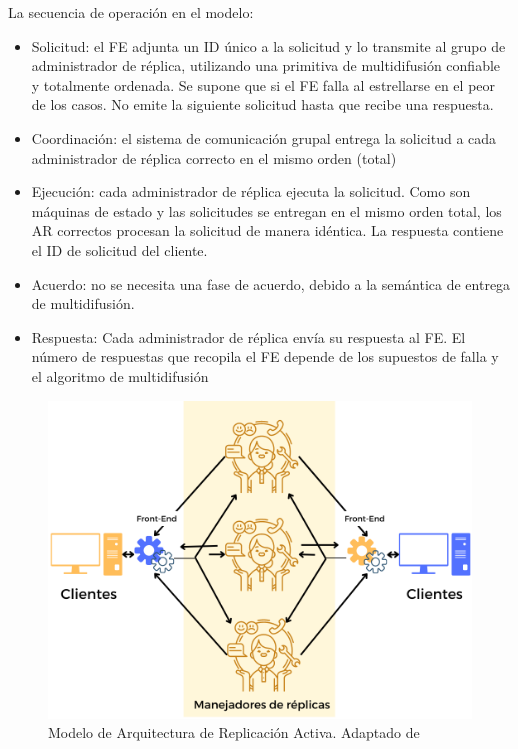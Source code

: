 	 La secuencia de  operación en el modelo:
	 \begin{itemize}
	 	\item  Solicitud: el FE adjunta un ID único a la solicitud y lo transmite al grupo de administrador de réplica, utilizando una primitiva de multidifusión confiable y totalmente ordenada. 
	 	Se supone que si el FE falla al estrellarse en el peor de los casos. No emite la siguiente solicitud hasta que recibe una respuesta. 
	 	\item Coordinación: el sistema de comunicación grupal entrega la solicitud a cada administrador de réplica correcto en el mismo orden (total) 
	 	
	 	\item Ejecución: cada administrador de réplica ejecuta la solicitud. Como son máquinas de estado y las solicitudes se entregan en el mismo orden total, los AR correctos procesan la solicitud de manera idéntica. La respuesta contiene el  ID de solicitud del cliente. 
	 	\item Acuerdo: no se necesita una fase de acuerdo, debido a la semántica de entrega de multidifusión. 
	 	\item Respuesta: Cada administrador de réplica envía su respuesta al FE. El número de respuestas que recopila el FE depende de los supuestos de falla y el algoritmo de multidifusión 
	 \end{itemize}
	 
 \begin{figure}    
 	\begin{center}%
 	\includegraphics [width=0.8\linewidth]{9/2.png } 
 	\caption{Modelo de Arquitectura de Replicación Activa. Adaptado de \cite{Coulouris2011} }
 	\label{fig:rep-act}
 \end{center}  
\end{figure}
 

